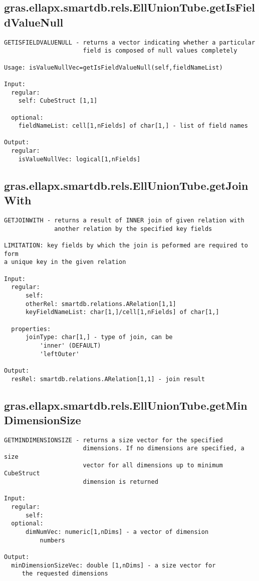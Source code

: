 \subsection{\texorpdfstring{gras.ellapx.smartdb.rels.EllUnionTube.getIsFieldValueNull}{getIsFieldValueNull}}\label{method:gras.ellapx.smartdb.rels.EllUnionTube.getIsFieldValueNull}
\begin{verbatim}
GETISFIELDVALUENULL - returns a vector indicating whether a particular
                      field is composed of null values completely

Usage: isValueNullVec=getIsFieldValueNull(self,fieldNameList)

Input:
  regular:
    self: CubeStruct [1,1]

  optional:
    fieldNameList: cell[1,nFields] of char[1,] - list of field names

Output:
  regular:
    isValueNullVec: logical[1,nFields]
\end{verbatim}
\subsection{\texorpdfstring{gras.ellapx.smartdb.rels.EllUnionTube.getJoinWith}{getJoinWith}}\label{method:gras.ellapx.smartdb.rels.EllUnionTube.getJoinWith}
\begin{verbatim}
GETJOINWITH - returns a result of INNER join of given relation with
              another relation by the specified key fields

LIMITATION: key fields by which the join is peformed are required to form
a unique key in the given relation

Input:
  regular:
      self:
      otherRel: smartdb.relations.ARelation[1,1]
      keyFieldNameList: char[1,]/cell[1,nFields] of char[1,]

  properties:
      joinType: char[1,] - type of join, can be
          'inner' (DEFAULT)
          'leftOuter'

Output:
  resRel: smartdb.relations.ARelation[1,1] - join result
\end{verbatim}
\subsection{\texorpdfstring{gras.ellapx.smartdb.rels.EllUnionTube.getMinDimensionSize}{getMinDimensionSize}}\label{method:gras.ellapx.smartdb.rels.EllUnionTube.getMinDimensionSize}
\begin{verbatim}
GETMINDIMENSIONSIZE - returns a size vector for the specified
                      dimensions. If no dimensions are specified, a size
                      vector for all dimensions up to minimum CubeStruct
                      dimension is returned

Input:
  regular:
      self:
  optional:
      dimNumVec: numeric[1,nDims] - a vector of dimension
          numbers

Output:
  minDimensionSizeVec: double [1,nDims] - a size vector for
     the requested dimensions
\end{verbatim}
